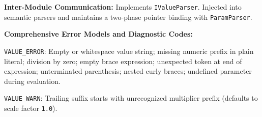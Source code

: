 \textbf{Inter-Module Communication:} Implements \texttt{IValueParser}. Injected into semantic parsers and maintains a two-phase pointer binding with \texttt{ParamParser}.

\textbf{Comprehensive Error Models and Diagnostic Codes:}
\begin{compactitem}
    \item \texttt{VALUE\_ERROR}: Empty or whitespace value string; missing numeric prefix in plain literal; division by zero; empty brace expression; unexpected token at end of expression; unterminated parenthesis; nested curly braces; undefined parameter during evaluation.
    \item \texttt{VALUE\_WARN}: Trailing suffix starts with unrecognized multiplier prefix (defaults to scale factor \texttt{1.0}).
\end{compactitem}


